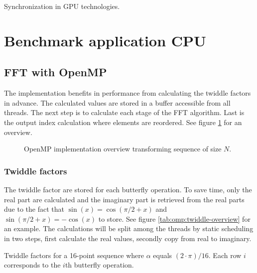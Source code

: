 \begin{table}[H]
	\centering
	
	\caption{Synchronization in \gls{GPU} technologies.}
	\label{tab:kernel-synchronization}
\end{table}

\section{Benchmark application CPU}

\subsection{FFT with OpenMP}

The {\OMP} implementation benefits in performance from calculating the twiddle factors in advance. The calculated values are stored in a buffer accessible from all threads. The next step is to calculate each stage of the \gls{FFT} algorithm. Last is the output index calculation where elements are reordered. See figure \ref{fig:omp:overview} for an overview.

\begin{figure}
	\centering
	
	\caption{OpenMP implementation overview transforming sequence of size $N$.}
	\label{fig:omp:overview}
\end{figure}

\subsubsection{Twiddle factors}

The twiddle factor are stored for each butterfly operation. To save time, only the real part are calculated and the imaginary part is retrieved from the real parts due to the fact that $\sin(x) = \cos(\pi/2 + x)$ and $\sin(\pi/2 + x) = -\cos(x)$ to store. See figure \ref{tab:omp:twiddle-overview} for an example. The calculations will be split among the threads by static scheduling in two steps, first calculate the real values, secondly copy from real to imaginary.

\begin{table}
	\centering
	
	\caption{Twiddle factors for a 16-point sequence where $\alpha$ equals $(2 \cdot \pi) / 16$. Each row $i$ corresponds to the $i$th butterfly operation.}
	\label{tab:omp:twiddle-overview}
\end{table}

